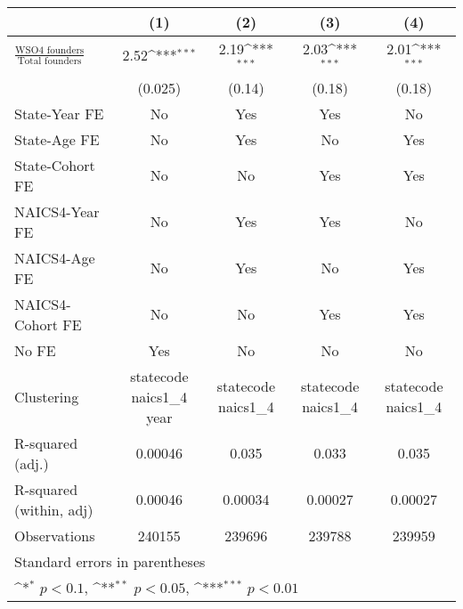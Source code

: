 {
\def\sym#1{\ifmmode^{#1}\else\(^{#1}\)\fi}
\begin{tabular}{l*{4}{c}}
\toprule
                    &\multicolumn{1}{c}{(1)}         &\multicolumn{1}{c}{(2)}         &\multicolumn{1}{c}{(3)}         &\multicolumn{1}{c}{(4)}         \\
\midrule
$\frac{\text{WSO4 founders}}{\text{Total founders}}$&        2.52\sym{***}&        2.19\sym{***}&        2.03\sym{***}&        2.01\sym{***}\\
                    &     (0.025)         &      (0.14)         &      (0.18)         &      (0.18)         \\
\addlinespace
State-Year FE       &          No         &         Yes         &         Yes         &          No         \\
\addlinespace
State-Age FE        &          No         &         Yes         &          No         &         Yes         \\
\addlinespace
State-Cohort FE     &          No         &          No         &         Yes         &         Yes         \\
\addlinespace
NAICS4-Year FE      &          No         &         Yes         &         Yes         &          No         \\
\addlinespace
NAICS4-Age FE       &          No         &         Yes         &          No         &         Yes         \\
\addlinespace
NAICS4-Cohort FE    &          No         &          No         &         Yes         &         Yes         \\
\addlinespace
No FE               &         Yes         &          No         &          No         &          No         \\
\midrule
Clustering          &statecode naics1\_4 year         &statecode naics1\_4         &statecode naics1\_4         &statecode naics1\_4         \\
R-squared (adj.)    &     0.00046         &       0.035         &       0.033         &       0.035         \\
R-squared (within, adj)&     0.00046         &     0.00034         &     0.00027         &     0.00027         \\
Observations        &      240155         &      239696         &      239788         &      239959         \\
\bottomrule
\multicolumn{5}{l}{\footnotesize Standard errors in parentheses}\\
\multicolumn{5}{l}{\footnotesize \sym{*} \(p<0.1\), \sym{**} \(p<0.05\), \sym{***} \(p<0.01\)}\\
\end{tabular}
}
